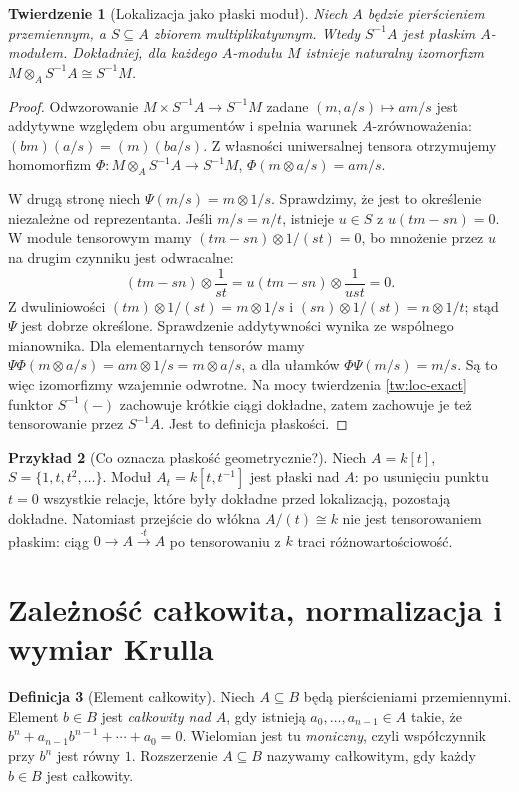 \documentclass[11pt,a4paper,openany]{report}
\numberwithin{equation}{section}
\theoremstyle{plain}
\newtheorem{twierdzenie}{Twierdzenie}[section]
\theoremstyle{definition}
\newtheorem{definicja}[twierdzenie]{Definicja}
\newtheorem{przyklad}[twierdzenie]{Przykład}
\theoremstyle{remark}
\begin{document}
\begin{twierdzenie}[Lokalizacja jako płaski moduł]
\label{tw:lokalizacja-plaska}
Niech $A$ będzie pierścieniem przemiennym, a $S\subseteq A$
zbiorem multiplikatywnym. Wtedy $S^{-1}A$ jest płaskim
$A$-modułem. Dokładniej, dla każdego $A$-modułu $M$
istnieje naturalny izomorfizm
$M\otimes_A S^{-1}A\cong S^{-1}M$.
\end{twierdzenie}
\begin{proof}
Odwzorowanie $M\times S^{-1}A\to S^{-1}M$ zadane
$(m,a/s)\mapsto am/s$ jest addytywne względem obu
argumentów i spełnia warunek $A$-zrównoważenia:
$(bm)(a/s)=(m)(ba/s)$. Z własności uniwersalnej
tensora otrzymujemy homomorfizm
$\Phi:M\otimes_A S^{-1}A\to S^{-1}M$,
$\Phi(m\otimes a/s)=am/s$.

W drugą stronę niech $\Psi(m/s)=m\otimes 1/s$.
Sprawdzimy, że jest to określenie niezależne od
reprezentanta. Jeśli $m/s=n/t$, istnieje $u\in S$
z $u(tm-sn)=0$. W module tensorowym mamy
$(tm-sn)\otimes 1/(st)=0$, bo mnożenie przez
$u$ na drugim czynniku jest odwracalne:
\[
 (tm-sn)\otimes\frac1{st}
 =u(tm-sn)\otimes\frac1{ust}=0.
\]
Z dwuliniowości
$(tm)\otimes 1/(st)=m\otimes 1/s$ i
$(sn)\otimes 1/(st)=n\otimes 1/t$;
stąd $\Psi$ jest dobrze określone. Sprawdzenie
addytywności wynika ze wspólnego mianownika.
Dla elementarnych tensorów mamy
$\Psi\Phi(m\otimes a/s)=am\otimes1/s
=m\otimes a/s$, a dla ułamków
$\Phi\Psi(m/s)=m/s$. Są to więc izomorfizmy
wzajemnie odwrotne. Na mocy twierdzenia
\ref{tw:loc-exact} funktor $S^{-1}(-)$ zachowuje
krótkie ciągi dokładne, zatem zachowuje je też
tensorowanie przez $S^{-1}A$. Jest to definicja
płaskości.
\end{proof}

\begin{przyklad}[Co oznacza płaskość geometrycznie?]
Niech $A=k[t]$, $S=\{1,t,t^2,\ldots\}$.
Moduł $A_t=k[t,t^{-1}]$ jest płaski nad $A$:
po usunięciu punktu $t=0$ wszystkie relacje,
które były dokładne przed lokalizacją, pozostają
dokładne. Natomiast przejście do włókna
$A/(t)\cong k$ nie jest tensorowaniem płaskim:
ciąg $0\to A\xrightarrow{\cdot t}A$ po
tensorowaniu z $k$ traci różnowartościowość.
\end{przyklad}

\section{Zależność całkowita, normalizacja i wymiar Krulla}
\label{sec:integral}
\begin{definicja}[Element całkowity]
Niech $A\subseteq B$ będą pierścieniami przemiennymi.
Element $b\in B$ jest \emph{całkowity nad $A$},
gdy istnieją $a_0,\ldots,a_{n-1}\in A$ takie, że
$b^n+a_{n-1}b^{n-1}+\cdots+a_0=0$.
Wielomian jest tu \emph{moniczny}, czyli współczynnik
przy $b^n$ jest równy $1$. Rozszerzenie $A\subseteq B$
nazywamy całkowitym, gdy każdy $b\in B$ jest całkowity.
\end{definicja}
\end{document}
